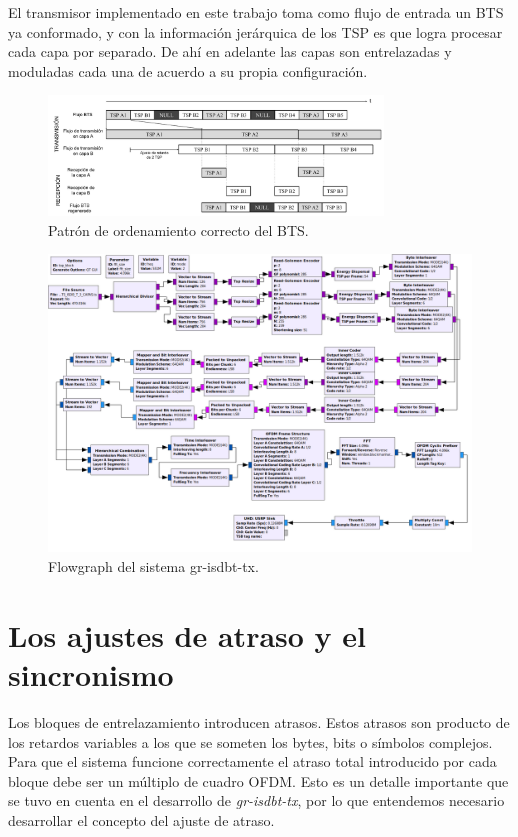 \documentclass[journal,comsoc]{IEEEtran}
\begin{document}
El transmisor implementado en este trabajo toma como flujo de entrada un
BTS ya conformado, y con la información jerárquica de los TSP es que logra
procesar cada capa por separado. De ahí en adelante las capas son entrelazadas y moduladas cada una de acuerdo a su propia configuración.

\begin{figure}[!h]
\centering
\includegraphics[width=3.5in]{figuras/bts2}
\caption{Patrón de ordenamiento correcto del BTS.}
\label{bts2}
\end{figure}

\begin{figure}[!h]
\centering
\includegraphics[width=5in]{figuras/flowgraph-tx}
\caption{Flowgraph del sistema gr-isdbt-tx.}
\label{flowgraph-tx}
\end{figure}


\section{Los ajustes de atraso y el sincronismo}
Los bloques de entrelazamiento introducen atrasos. Estos atrasos son producto de los retardos variables a los que se someten los bytes, bits o símbolos complejos. Para que el sistema funcione correctamente el atraso total introducido por cada bloque debe ser un múltiplo de cuadro OFDM. Esto es un detalle importante que se tuvo en cuenta en el desarrollo de \textit{gr-isdbt-tx}, por lo que entendemos necesario desarrollar el concepto del ajuste de atraso.
\end{document}
